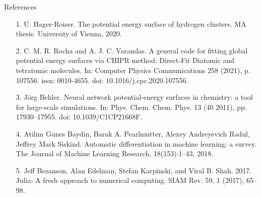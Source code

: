 \documentclass{beamer}
\begin{document}
\begin{frame}{References}
\fontsize{7}{6}\selectfont
\begin{itemize}
    \item [1.] U. Hager-Roiser. The potential energy surface of hydrogen clusters. MA thesis. University of Vienna, 2020.
    \item [2.] C. M. R. Rocha and A. J. C. Varandas. A general code for fitting global potential energy surfaces via CHIPR method: Direct-Fit Diatomic and tetratomic molecules. In: Computer Physics Communications 258 (2021), p. 107556. issn: 0010-4655. doi: 10.1016/j.cpc.2020.107556.
    \item [3.] Jörg Behler. Neural network potential-energy surfaces in chemistry: a tool for large-scale simulations. In: Phys. Chem. Chem. Phys. 13 (40 2011), pp. 17930–17955. doi: 10.1039/C1CP21668F.
    \item [4.] Atilim Gunes Baydin, Barak A. Pearlmutter, Alexey Andreyevich Radul, Jeffrey Mark Siskind. Automatic differentiation in machine learning: a survey. The Journal of Machine Learning Research, 18(153):1--43, 2018.
    \item [5.] Jeff Bezanson, Alan Edelman, Stefan Karpinski, and Viral B. Shah. 2017. Julia: A fresh approach to numerical computing. SIAM Rev. 59, 1 (2017), 65–98.
\end{itemize}
    
\end{frame}
\end{document}
